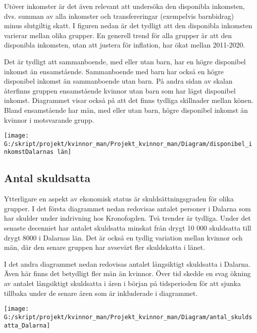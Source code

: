 \documentclass[
]{article}
\begin{document}
Utöver inkomster är det även relevant att undersöka den disponibla
inkomsten, dvs. summan av alla inkomster och transfereringar (exempelvis
barnbidrag) minus slutgiltig skatt. I figuren nedan är det tydligt att
den disponibla inkomsten varierar mellan olika grupper. En generell
trend för alla grupper är att den disponibla inkomsten, utan att justera
för inflation, har ökat mellan 2011-2020.

Det är tydligt att sammanboende, med eller utan barn, har en högre
disponibel inkomst än ensamstående. Sammanboende med barn har också en
högre disponibel inkomst än sammanboende utan barn. På andra sidan av
skalan återfinns gruppen ensamstående kvinnor utan barn som har lägst
disponibel inkomst. Diagrammet visar också på att det finns tydliga
skillnader mellan könen. Bland ensamstående har män, med eller utan
barn, högre disponibel inkomst än kvinnor i motsvarande grupp.

\begin{center}\texttt{[image: G:/skript/projekt/kvinnor\_man/Projekt\_kvinnor\_man/Diagram/disponibel\_inkomstDalarnas län]} \end{center}

\hypertarget{antal-skuldsatta}{%
\subsection{Antal skuldsatta}\label{antal-skuldsatta}}

Ytterligare en aspekt av ekonomisk status är skuldsättningsgraden för
olika grupper. I det första diagrammet nedan redovisas antalet personer
i Dalarna som har skulder under indrivning hos Kronofogden. Två trender
är tydliga. Under det senaste decenniet har antalet skuldsatta minskat
från drygt 10 000 skuldsatta till drygt 8000 i Dalarnas län. Det är
också en tydlig variation mellan kvinnor och män, där den senare gruppen
har avsevärt fler skuldskatta i länet.

I det andra diagrammet nedan redovisas antalet långsiktigt skuldsatta i
Dalarna. Även här finns det betydligt fler män än kvinnor. Över tid
skedde en svag ökning av antalet långsiktigt skuldsatta i åren i början
på tidsperioden för att sjunka tillbaka under de senare åren som är
inkluderade i diagrammet.

\begin{center}\texttt{[image: G:/skript/projekt/kvinnor\_man/Projekt\_kvinnor\_man/Diagram/antal\_skuldsatta\_Dalarna]} \end{center}
\end{document}
